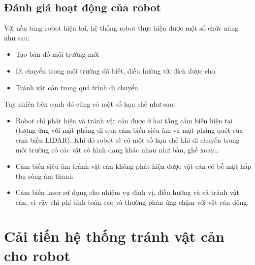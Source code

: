 \subsection{Đánh giá hoạt động của robot}

Với nền tảng robot hiện tại, hệ thống robot thực hiện được một số chức năng như sau:

\begin{itemize}
    \item Tạo bản đồ môi trường mới
    \item Di chuyển trong môi trường đã biết, điều hướng tới đích được cho.
    \item Tránh vật cản trong quá trình di chuyển.
\end{itemize}

Tuy nhiên bên cạnh đó cũng có một số hạn chế như sau:

\begin{itemize}
    \item Robot chỉ phát hiện và tránh vật cản được ở hai tầng cảm biến hiện tại (tương ứng với mặt phẳng đi qua cảm biến siêu âm và mặt phẳng quét của cảm biến LIDAR). Khi đó robot sẽ có một số hạn chế khi di chuyển trong môi trường có các vật có hình dạng khác nhau như bàn, ghế xoay\dots
    \item Cảm biến siêu âm tránh vật cản không phát hiện được vật cản có bề mặt hấp thụ sóng âm thanh
    \item Cảm biến laser sử dụng cho nhiệm vụ định vị, điều hướng và cả tránh vật cản, vì vậy chi phí tính toán cao và thường phản ứng chậm với vật cản động.
\end{itemize}


\section{Cải tiến hệ thống tránh vật cản cho robot}
\label{sec:caitienhethongtranhvatcan}


